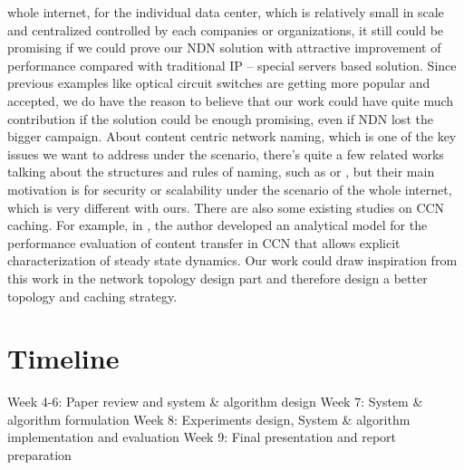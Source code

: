 \documentclass[journal]{IEEEtran}
\begin{document}
whole internet, for the individual data center, which is relatively small in
scale and centralized controlled by each companies or organizations, it still
could be promising if we could prove our NDN solution with attractive
improvement of performance compared with traditional IP – special servers based
solution. Since previous examples like optical circuit switches are getting more
popular and accepted, we do have the reason to believe that our work could have
quite much contribution if the solution could be enough promising, even if NDN
lost the bigger campaign.  About content centric network naming, which is one of
the key issues we want to address under the scenario, there’s quite a few
related works talking about the structures and rules of naming, such as
\cite{ghodsi2011naming} or \cite{primes}, but their main motivation is for
security or scalability under the scenario of the whole internet, which is very
different with ours.  There are also some existing studies on CCN caching. For
example, in \cite{carofiglio2011modeling}, the author developed an analytical
model for the performance evaluation of content transfer in CCN that allows
explicit characterization of steady state dynamics. Our work could draw
inspiration from this work in the network topology design part and therefore
design a better topology and caching strategy.

\section{Timeline}
Week 4-6: Paper review and system \& algorithm design 
Week 7:  System \& algorithm formulation 
Week 8: Experiments design, System \& algorithm implementation and 
evaluation 
Week 9: Final presentation and report preparation 





\end{document}
